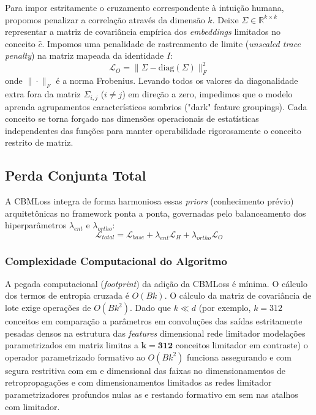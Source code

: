 \documentclass[times,twocolumn,final]{elsarticle}
\begin{document}
Para impor estritamente o cruzamento correspondente à intuição humana, propomos penalizar a correlação através da dimensão $k$.  Deixe $\Sigma \in \mathbb{R}^{k \times k}$ representar a matriz de covariância empírica dos \textit{embeddings} limitados no conceito $\hat{c}$. Impomos uma penalidade de rastreamento de limite (\textit{unscaled trace penalty}) na matriz mapeada  da identidade $I$:
\begin{equation}
    \mathcal{L}_{O} = \| \Sigma - \text{diag}(\Sigma) \|_F^2
\end{equation}
onde $\| \cdot \|_F$ é a norma Frobenius. Levando todos os valores da diagonalidade extra fora da matriz $\Sigma_{i, j}$ ($i \neq j$) em direção a zero, impedimos que o modelo aprenda agrupamentos característicos sombrios ("dark" feature groupings). Cada conceito se torna forçado nas dimensões operacionais de estatísticas independentes das funções para manter operabilidade rigorosamente o conceito restrito de matriz.

\subsection{Perda Conjunta Total}
A CBMLoss integra de forma harmoniosa essas \textit{priors} (conhecimento prévio) arquitetônicas no framework ponta a ponta, governadas pelo balanceamento dos hiperparâmetros $\lambda_{ent}$ e  $\lambda_{ortho}$:
\begin{equation}
    \mathcal{L}_{total} = \mathcal{L}_{base} + \lambda_{ent} \mathcal{L}_{H} + \lambda_{ortho} \mathcal{L}_{O}
\end{equation}

\subsubsection{Complexidade Computacional do Algoritmo}
A pegada computacional (\textit{footprint}) da adição da CBMLoss é mínima. O cálculo dos termos de entropia cruzada é $O(Bk)$. O cálculo da matriz de covariância de lote exige operações de $O(B k^2)$. Dado que $k \ll d$ (por exemplo, $k=312$ conceitos em comparação a parâmetros em convoluções das saídas estritamente pesadas densos na estrutura das \textit{features} dimensional rede limitador modelações parametrizados em matriz limitas a $\mathbf{k=312}$ conceitos limitador em contraste) o operador parametrizado formativo ao  $O(B k^2)$ funciona assegurando e com segura restritiva com em e dimensional das faixas no dimensionamentos de retropropagações e com dimensionamentos limitados as redes limitador parametrizadores profundos nulas as e restando formativo em sem nas atalhos com limitador.
\end{document}
